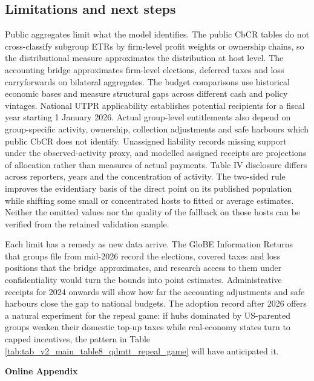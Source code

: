 \documentclass[11pt,a4paper]{article}
\begin{document}
\subsection{Limitations and next steps}\label{sec:limitations}

Public aggregates limit what the model identifies. The public CbCR tables do not cross-classify subgroup ETRs by firm-level profit weights or ownership chains, so the distributional measure approximates the distribution at host level. The accounting bridge approximates firm-level elections, deferred taxes and loss carryforwards on bilateral aggregates. The budget comparisons use historical economic bases and measure structural gaps across different cash and policy vintages. National UTPR applicability establishes potential recipients for a fiscal year starting 1 January 2026. Actual group-level entitlements also depend on group-specific activity, ownership, collection adjustments and safe harbours which public CbCR does not identify. Unassigned liability records missing support under the observed-activity proxy, and modelled assigned receipts are projections of allocation rather than measures of actual payments. Table IV disclosure differs across reporters, years and the concentration of activity. The two-sided rule improves the evidentiary basis of the direct point on its published population while shifting some small or concentrated hosts to fitted or average estimates. Neither the omitted values nor the quality of the fallback on those hosts can be verified from the retained validation sample.

Each limit has a remedy as new data arrive. The GloBE Information Returns that groups file from mid-2026 record the elections, covered taxes and loss positions that the bridge approximates, and research access to them under confidentiality would turn the bounds into point estimates. Administrative receipts for 2024 onwards will show how far the accounting adjustments and safe harbours close the gap to national budgets. The adoption record after 2026 offers a natural experiment for the repeal game: if hubs dominated by US-parented groups weaken their domestic top-up taxes while real-economy states turn to capped incentives, the pattern in Table \ref{tab:tab_v2_main_table8_qdmtt_repeal_game} will have anticipated it.




\clearpage
\appendix
{}
\begin{center}
{\Large\bfseries Online Appendix}
\end{center}
\end{document}
